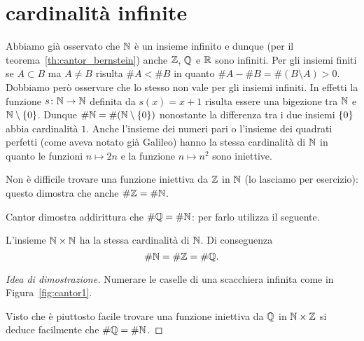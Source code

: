 \section{cardinalità infinite}
\label{sec:cardinali_infiniti}

Abbiamo già osservato che ${\mathbb N}$ è un insieme infinito e dunque (per il teorema~\ref{th:cantor_bernstein})
anche ${\mathbb Z}$, ${\mathbb Q}$ e ${\mathbb R}$ sono infiniti.
Per gli insiemi finiti se $A\subset B$ ma $A\neq B$ risulta $\#A < \# B$
in quanto $\#A - \#B = \#(B\setminus A) > 0$. 
Dobbiamo però osservare che lo stesso non vale per gli insiemi infiniti.
In effetti la funzione $s\colon {\mathbb N} \to {\mathbb N}$ definita da $s(x)=x+1$
risulta essere una bigezione tra ${\mathbb N}$ e ${\mathbb N}\setminus{\left\{ 0 \right\}}$. 
Dunque $\#{\mathbb N} = \#({\mathbb N}\setminus{\left\{ 0 \right\}})$ 
nonostante la differenza tra i due insiemi ${\left\{ 0 \right\}}$ abbia 
cardinalità $1$. 
Anche l'insieme dei numeri pari o l'insieme 
dei quadrati perfetti (come aveva notato già Galileo)
hanno la stessa cardinalità di ${\mathbb N}$ in quanto le funzioni $n\mapsto 2n$
e la funzione $n\mapsto n^2$ sono iniettive.

Non è difficile trovare una funzione iniettiva da ${\mathbb Z}$ in ${\mathbb N}$
(lo lasciamo per esercizio): questo dimostra che anche $\#{\mathbb Z} = \# {\mathbb N}$.

Cantor dimostra addirittura che $\#{\mathbb Q} = \#{\mathbb N}$: per farlo utilizza il seguente.

\begin{theorem}
\label{th:Cantor_primo}%
%
L'insieme ${\mathbb N} \times {\mathbb N}$ ha la stessa cardinalità di ${\mathbb N}$. Di conseguenza
\[
  \# {\mathbb N} = \# {\mathbb Z} = \# {\mathbb Q}.
  \]
\end{theorem}
%
\begin{proof}[Idea di dimostrazione]
  Numerare le caselle di una scacchiera infinita
  come in Figura~\ref{fig:cantor1}.
  
  Visto che è piuttosto facile trovare una funzione iniettiva 
  da ${\mathbb Q}$ in ${\mathbb N} \times {\mathbb Z}$ si deduce facilmente che $\#{\mathbb Q} = \#{\mathbb N}$.
\end{proof}

